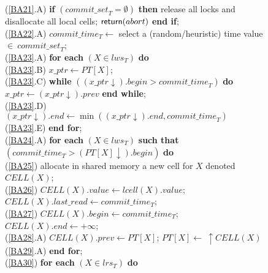 \begin{figure}[htb!]
{{\begin{minipage}[t]{150mm}
\begin{tabbing}
(\ref{BA21}.A) \> {\bf if} $(\mathit{commit\_set}_T = \emptyset)$ {\bf then}
      release all locks and disallocate all local cells; 		
      ${\sf return}(abort)$ {\bf end if};\\

(\ref{BA22}.A) \> $commit\_time_T \leftarrow$ 
         select a (random/heuristic) time value
         $\in ~\mathit{commit\_set}_T$; \\

(\ref{BA23}.A) \> {\bf for each} $(X \in lws_T)$ {\bf do} \\

(\ref{BA23}.B) \> \> $x\_ptr \leftarrow PT[X]$;\\

(\ref{BA23}.C) \> \> 
   {\bf while} $((x\_ptr \downarrow).\mathit{begin} > 
        \mathit{commit\_time}_T)$ {\bf do} 
        $x\_ptr \leftarrow (x\_ptr \downarrow).prev$ {\bf end while};\\

(\ref{BA23}.D) \> \> $(x\_ptr \downarrow).\mathit{end} \leftarrow 
    \min((x\_ptr \downarrow).\mathit{end},\mathit{commit\_time}_T)$\\

(\ref{BA23}.E) \> {\bf end for};\\


(\ref{BA24}.A) \> {\bf for each} $(X \in lws_T)$ 
   {\bf such that} $(\mathit{commit\_time}_T > 
       (PT[X] \downarrow).\mathit{begin})$ {\bf do}\\

(\ref{BA25}) \>\> \> 
       allocate in shared memory  a new cell for $X$ denoted $CELL(X)$; \\

(\ref{BA26}) \>\>\>  $CELL(X).value \gets lcell(X).value$;
                  $CELL(X).last\_read \gets commit\_time_T$;\\

(\ref{BA27}) \>\>\>  $CELL(X).begin \gets commit\_time_T$; 
                     $CELL(X).end \leftarrow +\infty$; \\

(\ref{BA28}.A) \>\>\>   $CELL(X).prev  \leftarrow PT[X]$;
                        $PT[X]  \leftarrow  ~ \uparrow CELL(X)$\\

(\ref{BA29}.A) \> {\bf end for};\\

(\ref{BA30}) \> {\bf for each} $(X \in lrs_T)$ {\bf do} \\



\end{tabbing}
\end{minipage}}}
\end{figure}
